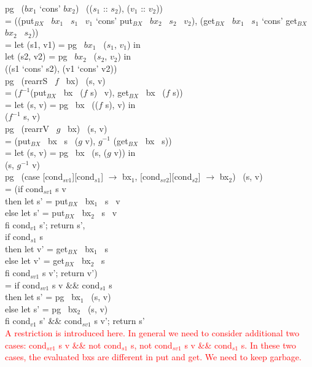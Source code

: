\documentclass[runningheads]{llncs}
\newcommand{\bxput}[3]{put$_{BX}$ \ {#1} \ {#2} \ {#3}}
\newcommand{\bxget}[2]{get$_{BX}$ \ {#1} \ {#2}}
\newcommand{\product}[2]{({#1} `cons' {#2})}
\newcommand{\tuple}[2]{(#1 :: #2)}
\newcommand{\rearrS}[2]{rearrS \ #1 \ #2}
\newcommand{\rearrV}[2]{rearrV \ #1 \ #2}
\newcommand{\pg}[3]{pg \ #1 \ (#2, #3)}
\newcommand{\casebx}[6]{case [#1][#2] $\to$ #3, [#4][#5] $\to$ #6}
\begin{document}
\noindent
\pg{\product{$bx_1$}{$bx_2$}}{\tuple{$s_1$}{$s_2$}}{\tuple{$v_1$}{$v_2$}}\\
= (\product{\bxput{$bx_1$}{$s_1$}{$v_1$}}{\bxput{$bx_2$}{$s_2$}{$v_2$}}, \product{\bxget{$bx_1$}{$s_1$}}{\bxget{$bx_2$}{$s_2$}})\\
= let (s1, v1) = \pg{$bx_1$}{$s_1$}{$v_1$} in\\
  let (s2, v2) = \pg{$bx_2$}{$s_2$}{$v_2$} in\\
  (\product{s1}{s2}, \product{v1}{v2})\\

  \noindent
\pg{(\rearrS{$f$}{bx})}{s}{v}\\
= ($f^{-1}$(\bxput{bx}{($f$ s)}{v}), \bxget{bx}{($f$ s)})\\
= let (s, v) = \pg{bx}{($f$ s)}{v} in\\
($f^{-1}$ s, v)\\

\noindent
\pg{(\rearrV{$g$}{bx})}{s}{v}\\
= (\bxput{bx}{s}{($g$ v)}, $g^{-1}$ (\bxget{bx}{s}))\\
= let (s, v) = \pg{bx}{s}{($g$ v)} in\\
  (s, $g^{-1}$ v)\\

\noindent
\pg{(\casebx{cond$_{sv1}$}{cond$_{s1}$}{bx$_1$}{cond$_{sv2}$}{cond$_{s2}$}{bx$_2$})}{s}{v}\\
= (if {cond$_{sv1}$ s v}\\
\hspace{4mm} then let s' = \bxput{bx$_1$}{s}{v}\\
\hspace{4mm} else let s' = \bxput{bx$_2$}{s}{v}\\
\hspace{4mm} fi cond$_{v1}$ s'; return s',\\
\hspace{4mm} if {cond$_{s1}$ s}\\
\hspace{4mm} then let v' = \bxget{bx$_1$}{s}\\
\hspace{4mm} else let v' = \bxget{bx$_2$}{s}\\
\hspace{4mm} fi cond$_{sv1}$ s v'; return v')\\
= if {cond$_{sv1}$ s v} \&\& {cond$_{s1}$ s}\\
\hspace{3mm} then let s' = \pg{bx$_1$}{s}{v}\\
\hspace{3mm} else let s' = \pg{bx$_2$}{s}{v}\\
\hspace{3mm} fi cond$_{v1}$ s' \&\& cond$_{sv1}$ s v'; return s'\\
\textcolor{red}{A restriction is introduced here. In general we need to consider additional two cases: {cond$_{sv1}$ s v} \&\& not {cond$_{s1}$ s}, not {cond$_{sv1}$ s v} \&\& {cond$_{s1}$ s}. In these two cases, the evaluated bxs are different in put and get. We need to keep garbage. }
\end{document}
